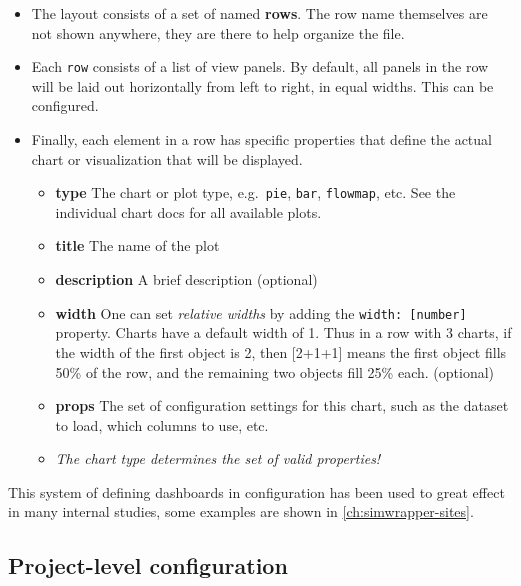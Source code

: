 \begin{itemize}
\item
  The layout consists of a set of named \textbf{rows}. The row name
  themselves are not shown anywhere, they are there to help organize the
  file.
\item
  Each \texttt{row} consists of a list of view panels. By default, all
  panels in the row will be laid out horizontally from left to right,
  in equal widths. This can be configured.
\item
  Finally, each element in a row has specific properties that define the
  actual chart or visualization that will be displayed.

  \begin{itemize}
  \item
    \textbf{type} The chart or plot type, e.g.~\texttt{pie},
    \texttt{bar}, \texttt{flowmap}, etc. See the individual chart docs
    for all available plots.
  \item
    \textbf{title} The name of the plot
  \item
    \textbf{description} A brief description (optional)
  \item
    \textbf{width} One can set \emph{relative widths} by adding the
    \texttt{width:\ {[}number{]}} property. Charts have a default width
    of 1. Thus in a row with 3 charts, if the width of the first object
    is 2, then {[}2+1+1{]} means the first object fills 50\% of the row,
    and the remaining two objects fill 25\% each. (optional)
  \item
    \textbf{props} The set of configuration settings for this chart,
    such as the dataset to load, which columns to use, etc.
  \item
    \emph{The chart type determines the set of valid properties!}
  \end{itemize}
\end{itemize}

This system of defining dashboards in configuration has been used to great effect in many internal studies, some examples are shown in \ref{ch:simwrapper-sites}.


\hypertarget{simwrapper-project-level-configuration}{%
\subsection{Project-level configuration}\label{project-level-configuration}}

